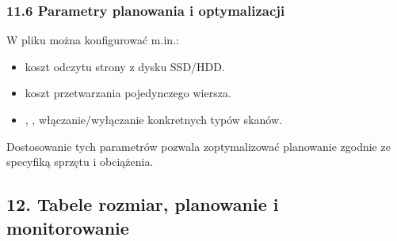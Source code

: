 \documentclass[a4paper,11pt,openany,english]{sphinxmanual}
\begin{document}
\sphinxAtStartPar
{}

\begin{sphinxVerbatim}[commandchars=\\\{\}]
        
    
\end{sphinxVerbatim}


\subsubsection{11.6 Parametry planowania i optymalizacji}
\label{\detokenize{rozdzial2/Konfiguracja_baz_danych/Konfiguracja_baz_danych:parametry-planowania-i-optymalizacji}}
\sphinxAtStartPar
W pliku  można konfigurować m.in.:
\begin{itemize}
\item {} 
\sphinxAtStartPar
{} \textendash{} koszt odczytu strony z dysku SSD/HDD.

\item {} 
\sphinxAtStartPar
{} \textendash{} koszt przetwarzania pojedynczego wiersza.

\item {} 
\sphinxAtStartPar
{}, ,  \textendash{} włączanie/wyłączanie konkretnych typów skanów.

\end{itemize}

\sphinxAtStartPar
Dostosowanie tych parametrów pozwala zoptymalizować planowanie zgodnie ze specyfiką sprzętu i obciążenia.


\subsection{12. Tabele \textendash{} rozmiar, planowanie i monitorowanie}
\label{\detokenize{rozdzial2/Konfiguracja_baz_danych/Konfiguracja_baz_danych:tabele-rozmiar-planowanie-i-monitorowanie}}
\end{document}
